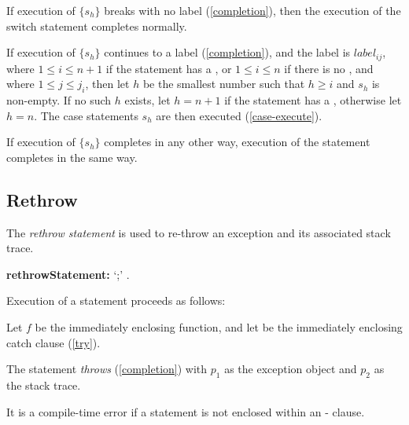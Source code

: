 \documentclass{article}
\begin{document}

If execution of $\{s_h\}$ breaks with no label (\ref{completion}), then the execution of the switch statement completes normally.

If execution of $\{s_h\}$ continues to a label (\ref{completion}), and the label is $label_{ij}$, where $1 \le i \le n+1$ if the \SWITCH{} statement has a \DEFAULT{}, or $1 \le i \le n$ if there is no \DEFAULT{}, and where $1 \le j \le j_{i}$, then
let $h$ be the smallest number such that $h \ge i$ and $s_h$ is non-empty.
If no such $h$ exists, let $h = n + 1$ if the \SWITCH{} statement has a \DEFAULT{}, otherwise let $h = n$.
The case statements $s_h$ are then executed (\ref{case-execute}).

If execution of $\{s_h\}$ completes in any other way, execution of the \SWITCH{} statement completes in the same way.


\subsection{Rethrow}

\LMHash{}
The {\em rethrow statement} is used to re-throw an exception and its associated stack trace.

\begin{grammar}
{\bf rethrowStatement:}\RETHROW{} `{\escapegrammar ;}'
  .
\end{grammar}

\LMHash{}
Execution of a \code{\RETHROW{}} statement proceeds as follows:

\LMHash{}
Let $f$ be the immediately enclosing function, and let  be the immediately enclosing catch clause (\ref{try}).


\LMHash{}
The \RETHROW{} statement {\em throws} (\ref{completion}) with $p_1$ as the exception object and $p_2$ as the stack trace.

\LMHash{}
It is a compile-time error if a \code{\RETHROW{}} statement is not enclosed within an \ON-\CATCH{} clause.
\end{document}
